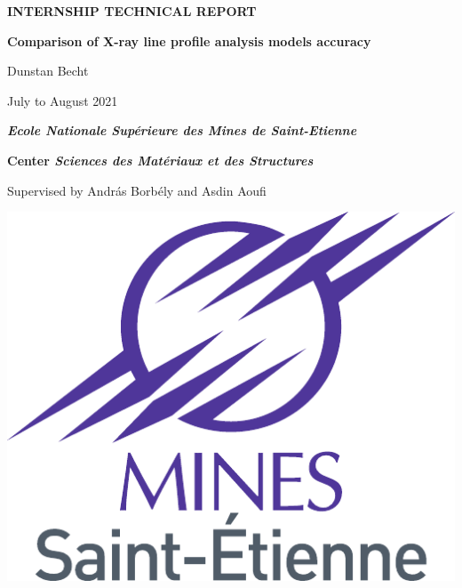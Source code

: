 \begin{titlepage}


\begin{center}

\vfill

\textbf{\huge \uppercase{Internship Technical Report}}

\vfill

\vfill

\begin{tcolorbox}

\begin{center}

\textbf{\Large Comparison of X-ray line profile analysis models accuracy}

\bigskip

{\large Dunstan Becht}

\bigskip

{\large July to August 2021}

\end{center}

\end{tcolorbox}

\vfill

\vfill

\textbf{\Large \textit{Ecole Nationale Supérieure des Mines de Saint-Etienne}}

\bigskip

\textbf{\Large Center \textit{Sciences des Matériaux et des Structures}}

\bigskip

{\large Supervised by András Borbély and Asdin Aoufi}

\vfill

\vfill

\includegraphics[width=0.3\linewidth]{insert/mines.pdf}

\end{center}

\vfill

\null

\end{titlepage}
